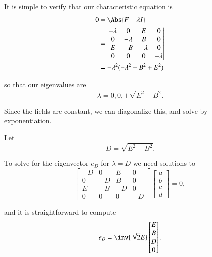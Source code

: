{It is simple to verify that our characteristic equation is
%
\begin{equation}\label{eqn:relElectroDynProblemSet2:1190}
\begin{aligned}
0
&= \Abs{ F - \lambda I } \\
&= \begin{vmatrix}
-\lambda & 0 & E & 0 \\
0 & -\lambda & B & 0 \\
E & -B & -\lambda & 0 \\
0 & 0 & 0 & -\lambda
\end{vmatrix} \\
&= -\lambda^2 ( -\lambda^2 - B^2 + E^2 )
\end{aligned}
\end{equation}

so that our eigenvalues are
%
\begin{equation}\label{eqn:relElectroDynProblemSet2:550}
\lambda = 0, 0, \pm \sqrt{E^2 - B^2}.
\end{equation}

Since the fields are constant, we can diagonalize this, and solve by exponentiation.

Let
%
\begin{equation}\label{eqn:relElectroDynProblemSet2:570}
D = \sqrt{E^2 - B^2}.
\end{equation}

To solve for the eigenvector \(e_D\) for \(\lambda = D\) we need solutions to
%
\begin{equation}\label{eqn:relElectroDynProblemSet2:590}
\begin{bmatrix}
-D & 0 & E & 0 \\
0 & -D & B & 0 \\
E & -B & -D & 0 \\
0 & 0 & 0 & -D
\end{bmatrix}
\begin{bmatrix}
a \\
b \\
c \\
d
\end{bmatrix}
 = 0,
\end{equation}

and it is straightforward to compute
%
\begin{equation}\label{eqn:relElectroDynProblemSet2:610}
e_D =
\inv{\sqrt{2}E}
\begin{bmatrix}
E \\
B \\
D \\
0
\end{bmatrix}.
\end{equation}

}
